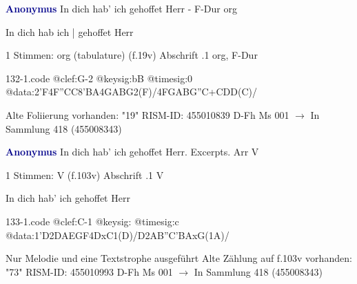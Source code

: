 \documentclass[twocolumn]{book}
\begin{document}
\newline \par \vspace{7pt} \textcolor{darkblue}{\textbf{Anonymus  }}
\newline In dich hab' ich gehoffet Herr - F-Dur
\newline org
\newline \begin{itshape}[f.19v, at left:] In dich hab ich | gehoffet Herr\end{itshape} 
\newline \textcolor{darkblue}{}  1 Stimmen: org (tabulature)  (f.19v)
\newline Abschrift
.1  org, F-Dur  
\begin{filecontents*}{132-1.code}
@clef:G-2
@keysig:bB
@timesig:0
@data:2'F4F''CC{8'BA}4GABG2(F)/4FGABG''C+CDD(C)/
\end{filecontents*}
\newline
%
\newline Alte Foliierung vorhanden: "19"
\newline RISM-ID: 455010839
\newline D-Fh  Ms 001
\newline $\rightarrow$ In Sammlung 418 (455008343)
      
\newline \par \vspace{7pt} \textcolor{darkblue}{\textbf{Anonymus  }}
\newline In dich hab' ich gehoffet Herr. Excerpts. Arr
\newline V
\newline \begin{itshape}\end{itshape} 
\newline \textcolor{darkblue}{}  1 Stimmen: V  (f.103v)
\newline Abschrift
.1  V
\newline \begin{footnotesize} In dich hab' ich gehoffet Herr \end{footnotesize}  
\begin{filecontents*}{133-1.code}
@clef:C-1
@keysig:
@timesig:c
@data:1'D2DAEGF4DxC1(D)/D2AB''C'BAxG(1A)/
\end{filecontents*}
\newline
%
\newline Nur Melodie und eine Textstrophe ausgeführt
\newline Alte Zählung auf f.103v vorhanden: "73"
\newline RISM-ID: 455010993
\newline D-Fh  Ms 001
\newline $\rightarrow$ In Sammlung 418 (455008343)
      
\end{document}
